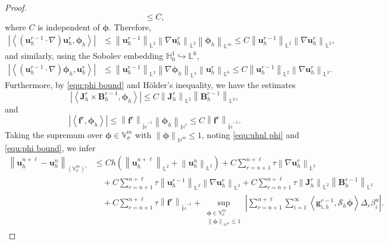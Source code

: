 \documentclass[11pt, reqno]{amsart}
\theoremstyle{definition}
\numberwithin{equation}{section}
\newcommand{\bff}{\boldsymbol}
\newcommand{\bb}{\mathbb}
\newcommand{\norm}[2]{\left\|{#1}\right\|_{#2}}
\newcommand{\inpro}[2]{\left\langle#1,#2\right\rangle}
\newcommand{\abs}[1]{\left|{#1}\right|}
\begin{document}
\begin{proof}
\begin{equation}
	\le
	C,
	\end{equation}
	where $C$ is independent of $\bff{\phi}$.
	Therefore,
	\begin{align*}
		\abs{
			\inpro{(\bff u_h^{r-1}\cdot\nabla)\bff u_h^r}{\bff\phi_h}
		}
		&\le
		\norm{\bff u_h^{r-1}}{\bb L^2}
		\norm{\nabla\bff u_h^r}{\bb L^2}
		\norm{\bff\phi_h}{\bb L^\infty}
		\le
		C\norm{\bff u_h^{r-1}}{\bb L^2}
		\norm{\nabla\bff u_h^r}{\bb L^2},
	\end{align*}
	and similarly, using the Sobolev embedding $\bb H_0^1\hookrightarrow \bb L^6$,
	\begin{align*}
		\abs{
			\inpro{(\bff u_h^{r-1}\cdot\nabla)\bff\phi_h}{\bff u_h^r}
		}
		&\le
		\norm{\bff u_h^{r-1}}{\bb L^2}
		\norm{\nabla\bff\phi_h}{\bb L^3}
		\norm{\bff u_h^r}{\bb L^6}
		\le
		C\norm{\bff u_h^{r-1}}{\bb L^2}
		\norm{\nabla\bff u_h^r}{\bb L^2}.
	\end{align*}
	Furthermore, by \eqref{equ:phi bound} and H\"older's inequality, we have the estimates
	\[
	\abs{
		\inpro{\bff J_h^r\times\bff B_h^{r-1}}{\bff\phi_h}
	}
	\le
	C\norm{\bff J_h^r}{\bb L^2}
	\norm{\bff B_h^{r-1}}{\bb L^2},
	\]
	and
	\[
	\abs{\inpro{\bff f^r}{\bff\phi_h}}
	\le
	\norm{\bff f^r}{\widetilde{\bb H}^{-1}}
	\norm{\bff\phi_h}{\bb H^1}
	\le
	C\norm{\bff f^r}{\widetilde{\bb H}^{-1}}.
	\]
	Taking the supremum over
	$\bff\phi\in\bb V_\sigma^m$ with $\norm{\bff\phi}{\bb H^m}\le1$, noting \eqref{equ:uhnl phi} and \eqref{equ:phi bound}, we infer
	\begin{align}
		\label{equ:conv velocity increment bound}
		\norm{\bff u_h^{n+\ell}-\bff u_h^n}{(\bb{V}^m_{\sigma})'}
		&\le
		Ch\left(
		\norm{\bff u_h^{n+\ell}}{\bb L^2}
		+
		\norm{\bff u_h^n}{\bb L^2}
		\right)
		+
		C\sum_{r=n+1}^{n+\ell}\tau
		\norm{\nabla\bff u_h^r}{\bb L^2}
		\nonumber\\
		&\quad
		+
		C\sum_{r=n+1}^{n+\ell}\tau
		\norm{\bff u_h^{r-1}}{\bb L^2}
		\norm{\nabla\bff u_h^r}{\bb L^2}
		+
		C\sum_{r=n+1}^{n+\ell}\tau
		\norm{\bff J_h^r}{\bb L^2}
		\norm{\bff B_h^{r-1}}{\bb L^2}
		\nonumber\\
		&\quad
		+
		C\sum_{r=n+1}^{n+\ell}\tau
		\norm{\bff f^r}{\widetilde{\bb H}^{-1}}
		+
		\sup_{\substack{\bff\phi\in\bb V_\sigma^m\\
				\norm{\bff\phi}{\bb H^m}\le1}}
		\abs{
			\sum_{r=n+1}^{n+\ell}\sum_{i=1}^{\infty}
			\inpro{\bff g_{i,h}^{r-1}}{\mathcal S_h\bff\phi}
			\Delta_r\beta_i^u
		}.
	\end{align}
	

\end{proof}
\end{document}
